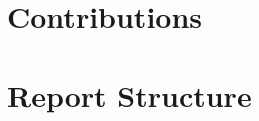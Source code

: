 \documentclass[main.tex]{subfiles}
\begin{document}



\section{Contributions}
\label{sec:contributions}

\section{Report Structure}
\label{sec:structure}


\biblio
\end{document}
